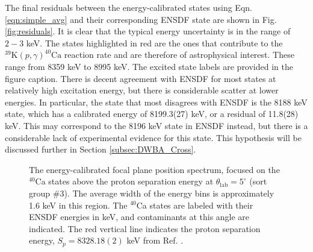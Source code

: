 The final residuals between the energy-calibrated states using Eqn. \ref{eqn:simple_avg} and their corresponding ENSDF state are shown in Fig. \ref{fig:residuals}. It is clear that the typical energy uncertainty is in the range of $2-3$ keV. The states highlighted in red are the ones that contribute to the $^{39}\mathrm{K}(p,\gamma)^{40}\mathrm{Ca}$ reaction rate and are therefore of astrophysical interest. These range from 8359 keV to 8995 keV. The excited state labels are provided in the figure caption. There is decent agreement with ENSDF for most states at relatively high excitation energy, but there is considerable scatter at lower energies. In particular, the state that most disagrees with ENSDF is the 8188 keV state, which has a calibrated energy of 8199.3(27) keV, or a residual of 11.8(28) keV. This may correspond to the 8196 keV state in ENSDF instead, but there is a considerable lack of experimental evidence for this state. This hypothesis will be discussed further in Section \ref{subsec:DWBA_Cross}.

\begin{figure}[t]
\centering
{}
\caption{\label{fig:AstroRegion}The energy-calibrated focal plane position spectrum, focused on the $^{40}$Ca states above the proton separation energy at $\theta_{\mathrm{lab}} = 5^{\circ}$ (sort group $\#$3). The average width of the energy bins is approximately 1.6 keV in this region. The $^{40}$Ca states are labeled with their ENSDF \cite{Chen2017} energies in keV, and contaminants at this angle are indicated. The red vertical line indicates the proton separation energy, $S_{p} = 8328.18(2)$ keV from Ref. \cite{Wang2021}.}
\end{figure}

